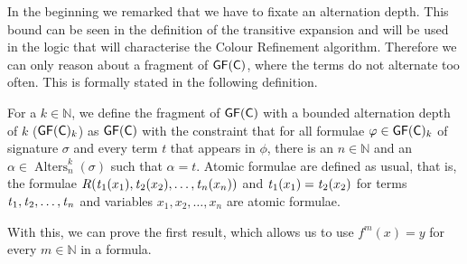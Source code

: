 In the beginning we remarked that we have to fixate an alternation depth.
This bound can be seen in the definition of the transitive expansion and will be used in the logic that will characterise the Colour Refinement algorithm.
Therefore we can only reason about a fragment of $\mathsf{GF}(\mathsf{C})$, where the terms do not alternate too often.
This is formally stated in the following definition.

\begin{definition}
	For a $k\in\mathbb N$, we define the fragment of $\mathsf{GF}(\mathsf{C})$ with a bounded alternation depth of $k$ ($\mathsf{GF}(\mathsf{C})_k$) as $\mathsf{GF}(\mathsf{C})$ with the constraint that for all formulae $\varphi\in\mathsf{GF}(\mathsf{C})_k$ of signature $\sigma$ and every term $t$ that appears in $\phi$, there is an $n\in \mathbb{N}$ and an $\alpha\in \operatorname{Alters}_n^k(\sigma)$ such that $\alpha=t$.
	Atomic formulae are defined as usual, that is, the formulae $R(\operatorname{\mathit{t}}_1(x_1),\operatorname{\mathit{t}}_2(x_2),\dots,\operatorname{\mathit{t}}_n(x_n))$ and $\operatorname{\mathit{t}}_1(x_1)=\operatorname{\mathit{t}}_2(x_2)$ for terms $\operatorname{\mathit{t}}_1,\operatorname{\mathit{t}}_2,\dots,\operatorname{\mathit{t}}_n$ and variables $x_1,x_2,\dots,x_n$ are atomic formulae.
\end{definition}

With this, we can prove the first result, which allows us to use $f^m(x)=y$ for every $m\in \mathbb N$ in a formula.

